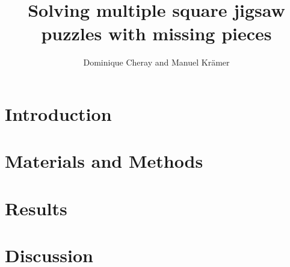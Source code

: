 \documentclass[]{report}
\title{Solving multiple square jigsaw puzzles with missing pieces}
\author{Dominique Cheray and Manuel Krämer}
\begin{document}
\maketitle

\begin{abstract}
\end{abstract}

\chapter{Introduction}

\chapter{Materials and Methods}

\chapter{Results}

\chapter{Discussion}

\nocite{*}

\end{document}
